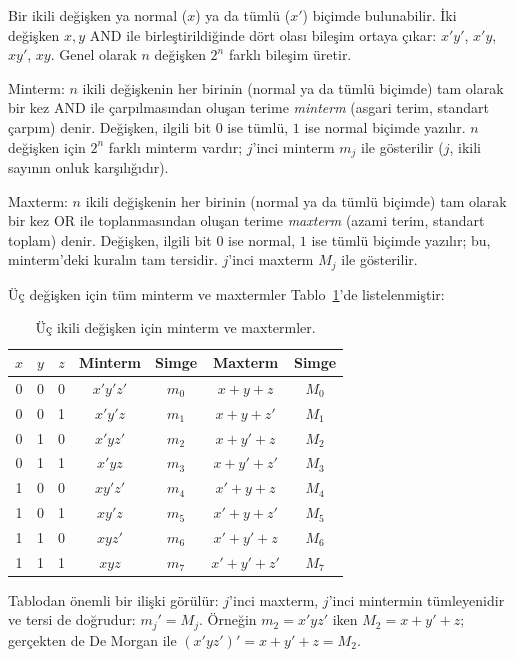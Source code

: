 Bir ikili değişken ya normal ($x$) ya da tümlü ($x'$) biçimde bulunabilir. İki değişken
$x,y$ AND ile birleştirildiğinde dört olası bileşim ortaya çıkar: $x'y'$, $x'y$, $xy'$,
$xy$. Genel olarak $n$ değişken $2^n$ farklı bileşim üretir.

\begin{tanim}{Minterm:}
$n$ ikili değişkenin her birinin (normal ya da tümlü biçimde) tam olarak bir kez
AND ile çarpılmasından oluşan terime \emph{minterm} (asgari terim, standart çarpım)
denir. Değişken, ilgili bit $0$ ise tümlü, $1$ ise normal biçimde yazılır. $n$ değişken
için $2^n$ farklı minterm vardır; $j$'inci minterm $m_j$ ile gösterilir ($j$, ikili
sayının onluk karşılığıdır).
\end{tanim}

\begin{tanim}{Maxterm:}
$n$ ikili değişkenin her birinin (normal ya da tümlü biçimde) tam olarak bir kez OR
ile toplanmasından oluşan terime \emph{maxterm} (azami terim, standart toplam) denir.
Değişken, ilgili bit $0$ ise normal, $1$ ise tümlü biçimde yazılır; bu,
minterm'deki kuralın tam tersidir. $j$'inci maxterm $M_j$ ile gösterilir.
\end{tanim}

Üç değişken için tüm minterm ve maxtermler Tablo~\ref{tab:minterm-maxterm}'de
listelenmiştir:

\begin{table}[H]
\centering
\begin{tabular}{ccc|cc|cc}
\toprule
$x$&$y$&$z$&Minterm&Simge&Maxterm&Simge\\
\midrule
0&0&0&$x'y'z'$&$m_0$&$x+y+z$&$M_0$\\
0&0&1&$x'y'z$&$m_1$&$x+y+z'$&$M_1$\\
0&1&0&$x'yz'$&$m_2$&$x+y'+z$&$M_2$\\
0&1&1&$x'yz$&$m_3$&$x+y'+z'$&$M_3$\\
1&0&0&$xy'z'$&$m_4$&$x'+y+z$&$M_4$\\
1&0&1&$xy'z$&$m_5$&$x'+y+z'$&$M_5$\\
1&1&0&$xyz'$&$m_6$&$x'+y'+z$&$M_6$\\
1&1&1&$xyz$&$m_7$&$x'+y'+z'$&$M_7$\\
\bottomrule
\end{tabular}
\caption{Üç ikili değişken için minterm ve maxtermler.}
\label{tab:minterm-maxterm}
\end{table}

Tablodan önemli bir ilişki görülür: $j$'inci maxterm, $j$'inci mintermin tümleyenidir
ve tersi de doğrudur: $m_j'=M_j$. Örneğin $m_2=x'yz'$ iken $M_2=x+y'+z$; gerçekten de
De Morgan ile $(x'yz')'=x+y'+z=M_2$.

